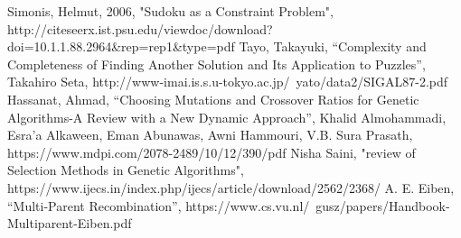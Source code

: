 \documentclass[12pt, conference]{IEEEtran}
\begin{document}
\begin{thebibliography}{00}

Simonis, Helmut, 2006, "Sudoku as a Constraint Problem", http://citeseerx.ist.psu.edu/viewdoc/download?doi=10.1.1.88.2964\&rep=rep1\&type=pdf
Tayo, Takayuki, “Complexity and Completeness of Finding Another Solution and Its Application to Puzzles”, Takahiro Seta, http://www-imai.is.s.u-tokyo.ac.jp/~yato/data2/SIGAL87-2.pdf
Hassanat, Ahmad, “Choosing Mutations and Crossover Ratios for Genetic Algorithms-A Review with a New Dynamic Approach”,  Khalid Almohammadi, Esra’a Alkaween, Eman Abunawas, Awni Hammouri, V.B. Sura Prasath, https://www.mdpi.com/2078-2489/10/12/390/pdf 
Nisha Saini, "review of Selection Methods in Genetic Algorithms", https://www.ijecs.in/index.php/ijecs/article/download/2562/2368/
A. E. Eiben, “Multi-Parent Recombination”, https://www.cs.vu.nl/~gusz/papers/Handbook-Multiparent-Eiben.pdf

\end{thebibliography}
\end{document}
